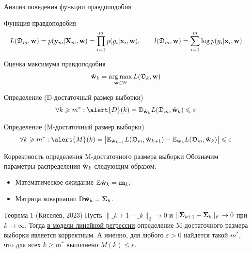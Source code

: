 \documentclass[aspectratio=169]{beamer}
\begin{document}
\begin{frame}{Анализ поведения функции правдоподобия}
    \begin{block}{Функция правдоподобия}
        \vspace{-0.5cm}
        \[ L(\mathfrak{D}_m, \mathbf{w}) = p(\mathbf{y}_m | \mathbf{X}_m, \mathbf{w}) = \prod_{i=1}^{m} p(y_i | \mathbf{x}_i, \mathbf{w}), \qquad l(\mathfrak{D}_m, \mathbf{w}) = \sum\limits_{i=1}^{m} \log p(y_i | \mathbf{x}_i, \mathbf{w}) \]
        \vspace{-0.5cm}
    \end{block}
    \begin{block}{Оценка максимума правдоподобия}
        \vspace{-0.2cm}
        \[ \hat{\mathbf{w}}_{k} = \operatorname*{arg\,max}_{\mathbf{w} \in \mathbb{W}} L(\mathfrak{D}_k, \mathbf{w}) \]
        \vspace{-0.5cm}
    \end{block}
    \begin{block}{Определение (\alert{D}-достаточный размер выборки)}
        \[ \forall k \geqslant m^*: \alert{D}(k) = \mathbb{D}_{\hat{\mathbf{w}}_{k}} L(\mathfrak{D}_m, \hat{\mathbf{w}}_{k}) \leqslant \varepsilon \]
    \end{block}
    \begin{block}{Определение (\alert{M}-достаточный размер выборки)}
        \[ \forall k \geqslant m^*: \alert{M}(k) = \left| \mathbb{E}_{\hat{\mathbf{w}}_{k+1}} L(\mathfrak{D}_m, \hat{\mathbf{w}}_{k+1}) - \mathbb{E}_{\hat{\mathbf{w}}_{k}} L(\mathfrak{D}_m, \hat{\mathbf{w}}_{k}) \right| \leqslant \varepsilon \]
    \end{block}
\end{frame}

\begin{frame}{Корректность определения M-достаточного размера выборки}
    Обозначим параметры распределения $\hat{\mathbf{w}}_k$ следующим образом:
    \begin{itemize}
        \item Математическое ожидание $\mathbb{E} \hat{\mathbf{w}}_k = \mathbf{m}_k$;
        \item Матрица ковариации $\mathbb{D} \hat{\mathbf{w}}_k = \boldsymbol{\Sigma}_k$. 
    \end{itemize}
    \begin{block}{Теорема 1 (Киселев, 2023)}
        Пусть $\| \bm_{k+1} - \bm_k \|_2 \to 0$ и $\| \boldsymbol{\Sigma}_{k+1} - \boldsymbol{\Sigma}_k \|_{F} \to 0$ при $k \to \infty$. Тогда \underline{в модели линейной регрессии} определение M-достаточного размера выборки является корректным. А именно, для любого $\varepsilon > 0$ найдется такой $m^*$, что для всех $k \geqslant m^*$ выполнено $M(k) \leqslant \varepsilon$.
    \end{block}
\end{frame}
\end{document}
